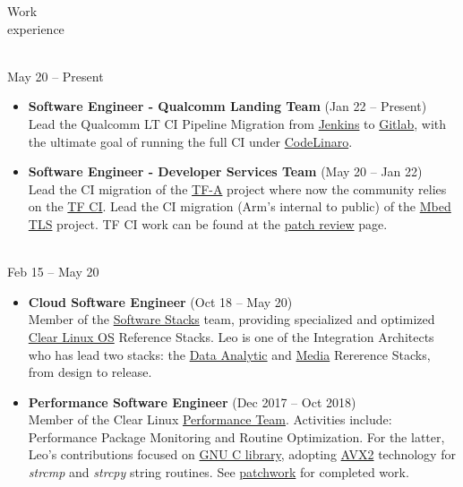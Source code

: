 \documentclass{resume}
\def\linaro{Linaro Limited}
\def\intel{Intel Corporation}
\def\cl{Clear Linux OS}
\begin{document}
\begin{category}{Work \\experience}

\citem{\linaro}\\
May 20 -- Present

\begin{itemize}
\item \textbf{Software Engineer - Qualcomm Landing Team} (Jan 22 -- Present)\\
  Lead the Qualcomm LT CI Pipeline Migration from \href{https://ci.linaro.org/view/qclt/}{Jenkins} to
  \href{https://gitlab.com/lt-qcom-gitlab-ci}{Gitlab}, with the ultimate goal of running the full CI
  under \href{https://www.codelinaro.org/}{CodeLinaro}.
\end{itemize}

\begin{itemize}
\item \textbf{Software Engineer - Developer Services Team} (May 20 -- Jan 22)\\
  Lead the CI migration of the \href{https://www.trustedfirmware.org/projects/tf-a/}{TF-A}
  project where now the community relies on the \href{https://ci.trustedfirmware.org/}{TF CI}.
  Lead the CI migration (Arm's internal to public) of the \href{https://github.com/ARMmbed/mbedtls}{Mbed TLS}
  project. TF CI work can be found at the
  \href{https://review.trustedfirmware.org/q/owner:leonardo.sandoval%2540linaro.org}{patch review} page.
\end{itemize}

\citem{\intel}\\
Feb 15 -- May 20
\begin{itemize}
\item \textbf{Cloud Software Engineer} (Oct 18 -- May 20)\\
  Member of the \href{https://github.com/intel/stacks}{Software Stacks} team,
  providing specialized and optimized \href{https://clearlinux.org/}{\cl} Reference Stacks.
  Leo is one of the Integration Architects who has lead two stacks:
  the \href{https://github.com/intel/stacks/blob/master/dars/dars.rst}{Data Analytic}
  and \href{https://github.com/intel/stacks/blob/master/mers/README.md}{Media} Rererence Stacks,
  from design to release.
\end{itemize}

\begin{itemize}
\item \textbf{Performance Software Engineer} (Dec 2017 -- Oct 2018)\\
  Member of the Clear Linux \href{https://clearlinux.org/}{Performance Team}.
  Activities include: Performance Package Monitoring and Routine Optimization.
  For the latter, Leo's contributions focused on
  \href{https://www.gnu.org/software/libc/}{GNU C library},
  adopting \href{}{AVX2} technology for \textit{strcmp} and \textit{strcpy} string routines.
  See \href{https://patchwork.ozlabs.org/project/glibc/list/?submitter=74072}{patchwork}
  for completed work.
\end{itemize}


\end{category}
\end{document}
